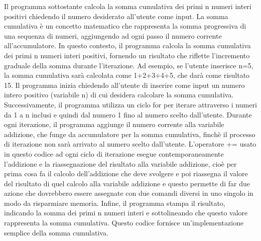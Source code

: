 \documentclass[11pt]{article}
\begin{document}
    Il programma sottostante calcola la somma cumulativa dei primi n numeri
interi positivi chiedendo il numero desiderato all'utente come input. La
somma cumulativa è un concetto matematico che rappresenta la somma
progressiva di una sequenza di numeri, aggiungendo ad ogni passo il
numero corrente all'accumulatore. In questo contesto, il programma
calcola la somma cumulativa dei primi n numeri interi positivi, fornendo
un risultato che riflette l'incremento graduale della somma durante
l'iterazione. Ad esempio, se l'utente inserisce n=5, la somma cumulativa
sarà calcolata come 1+2+3+4+5, che darà come risultato 15. Il programma
inizia chiedendo all'utente di inserire come input un numero intero
positivo (variabile n) di cui desidera calcolare la somma cumulativa.
Successivamente, il programma utilizza un ciclo for per iterare
attraverso i numeri da 1 a n inclusi e quindi dal numero 1 fino al
numero scelto dall'utente. Durante ogni iterazione, il programma
aggiunge il numero corrente alla variabile addizione, che funge da
accumulatore per la somma cumulativa, finchè il processo di iterazione
non sarà arrivato al numero scelto dall'utente. L'operatore += usato in
questo codice ad ogni ciclo di iterazione esegue contemporaneamente
l'addizione e la riassegnazione del risultato alla variabile addizione,
cioè per prima cosa fa il calcolo dell'addizione che deve svolgere e poi
riassegna il valore del risultato di quel calcolo alla variabile
addizione e questo permette di far due azione che dovrebbero essere
assegnate con due comandi diversi in uno singolo in modo da risparmiare
memoria. Infine, il programma stampa il risultato, indicando la somma
dei primi n numeri interi e sottolineando che questo valore rappresenta
la somma cumulativa. Questo codice fornisce un'implementazione semplice
della somma cumulativa.
\end{document}
